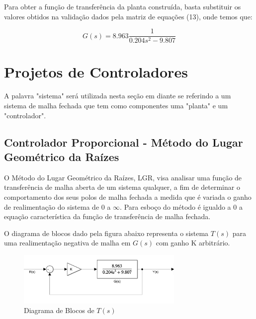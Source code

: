 \documentclass[conference,harvard,brazil,english]{sbatex}
\begin{document}
                Para obter a função de transferência da planta construída, basta substituir os valores obtidos na validação dados pela matriz de equações (13), onde temos que:
                
                \begin{equation}
                    G(s)= 8.963 \frac{1}{0.204s^2 - 9.807}
                \end{equation}
        
    \section{Projetos de Controladores}
    
        A palavra "sistema" será utilizada nesta seção em diante se referindo a um sistema de malha fechada que tem como componentes uma "planta" e um "controlador".
    
        \subsection{Controlador Proporcional - Método do Lugar Geométrico da Raízes}
        
            O Método do Lugar Geométrico da Raízes, LGR, visa analisar uma função de transferência de malha aberta de um sistema qualquer, a fim de determinar o comportamento dos seus polos de malha fechada a medida que é variada o ganho de realimentação do sistema de 0 a $\infty$. Para esboço do método é igualdo a $0$ a equação característica da função de transferência de malha fechada.
            
            O diagrama de blocos dado pela figura abaixo representa o sistema $T(s)$ para uma realimentação negativa de malha em $G(s)$ com ganho K arbitrário.
            
            \begin{figure}[h]
                \centering
                \includegraphics[width=8cm]{imagens/graficos/DiagramaK.png}
                \caption{Diagrama de Blocos de $T(s)$}
            \end{figure}
            
\end{document}

